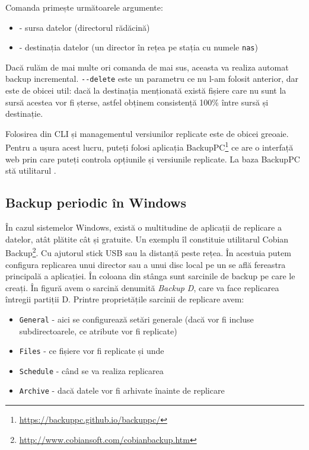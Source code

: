 Comanda  primește următoarele argumente:

\begin{itemize}
  \item \file{/} - sursa datelor (directorul rădăcină)
  \item {} - destinația datelor (un director în rețea pe
    stația cu numele \texttt{nas})
\end{itemize}


Dacă rulăm de mai multe ori comanda de mai sus, aceasta va realiza automat
backup incremental. \texttt{-{}-delete} este un parametru ce nu l-am folosit
anterior, dar este de obicei util: dacă la destinația menționată există fișiere
care nu sunt la sursă acestea vor fi șterse, astfel obținem consistență 100\%
între sursă și destinație.

Folosirea  din CLI și managementul versiunilor replicate este de obicei
greoaie. Pentru a ușura acest lucru, puteți folosi aplicația BackupPC\footnote{\url{https://backuppc.github.io/backuppc/}} ce are o interfață web prin care puteți
controla opțiunile și versiunile replicate. La baza BackupPC stă utilitarul
.

\subsection{Backup periodic în Windows}
\label{sec:storage:backup:windows}

În cazul sistemelor Windows, există o multitudine de aplicații de replicare a
datelor, atât plătite cât și gratuite. Un exemplu îl constituie utilitarul
Cobian Backup\footnote{\url{http://www.cobiansoft.com/cobianbackup.htm}}. Cu ajutorul
stick USB sau la distanță peste rețea. În
acestuia putem configura replicarea unui director sau a unui disc local pe un
 se află fereastra principală a
aplicației. În coloana din stânga sunt sarcinile de backup pe care le creați. În
figură avem o sarcină denumită \textit{Backup D}, care va face replicarea
întregii partiții D. Printre proprietățile sarcinii de replicare avem:

\begin{itemize}
  \item \texttt{General} - aici se configurează setări generale (dacă vor fi
		incluse subdirectoarele, ce atribute vor fi replicate)
              \item \texttt{Files} - ce fișiere vor fi replicate și unde
              \item \texttt{Schedule} - când se va realiza replicarea
              \item \texttt{Archive} - dacă datele vor fi arhivate înainte de replicare
\end{itemize}

